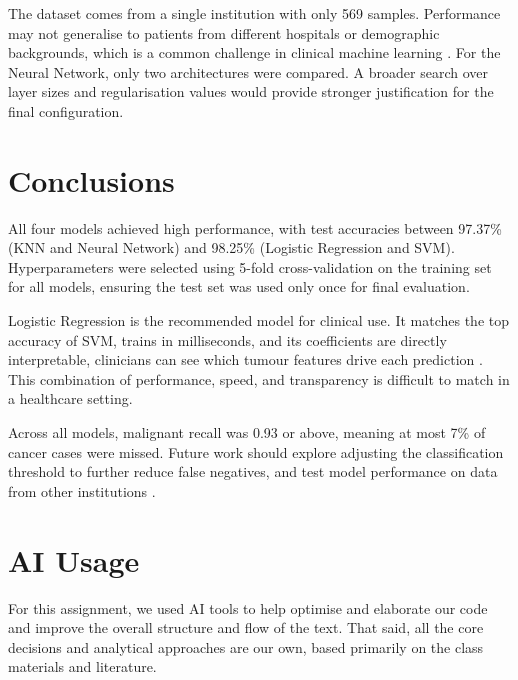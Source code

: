 \documentclass[twocolumn, fontsize=10pt]{article}
\begin{document}
The dataset comes from a single institution with only 569 samples. Performance may not generalise to patients from different hospitals or demographic backgrounds, which is a common challenge in clinical machine learning \citep{james2021statistical}.
For the Neural Network, only two architectures were compared. A broader search over layer sizes and regularisation values would provide stronger justification for the final configuration.


\section{Conclusions}
\label{sec:conclusions}
All four models achieved high performance, with test accuracies between 97.37\% (KNN and Neural Network) and 98.25\% (Logistic Regression and SVM). Hyperparameters were selected using 5-fold cross-validation on the training set for all models, ensuring the test set was used only once for final evaluation.

Logistic Regression is the recommended model for clinical use. It matches the top accuracy of SVM, trains in milliseconds, and its coefficients are directly interpretable, clinicians can see which tumour features drive each prediction \citep{bishop2006pattern}. This combination of performance, speed, and transparency is difficult to match in a healthcare setting.

Across all models, malignant recall was 0.93 or above, meaning at most 7\% of cancer cases were missed. Future work should explore adjusting the classification threshold to further reduce false negatives, and test model performance on data from other institutions \citep{hastie2009elements}.

\section*{AI Usage}
For this assignment, we used AI tools to help optimise and elaborate our code and improve the overall structure and flow of the text. That said, all the core decisions and analytical approaches are our own, based primarily on the class materials and literature.
\end{document}
